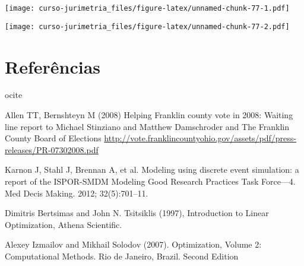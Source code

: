 \documentclass[]{book}
\newenvironment{Shaded}{\begin{snugshade}}{\end{snugshade}}
\newcommand{\KeywordTok}[1]{\textcolor[rgb]{0.13,0.29,0.53}{\textbf{{#1}}}}
\newcommand{\DataTypeTok}[1]{\textcolor[rgb]{0.13,0.29,0.53}{{#1}}}
\newcommand{\DecValTok}[1]{\textcolor[rgb]{0.00,0.00,0.81}{{#1}}}
\newcommand{\StringTok}[1]{\textcolor[rgb]{0.31,0.60,0.02}{{#1}}}
\newcommand{\NormalTok}[1]{{#1}}
\begin{document}
\texttt{[image: curso-jurimetria\_files/figure-latex/unnamed-chunk-77-1.pdf]}

\begin{Shaded}
\end{Shaded}

\texttt{[image: curso-jurimetria\_files/figure-latex/unnamed-chunk-77-2.pdf]}

\chapter{Referências}\label{referencias}

ocite

Allen TT, Bernshteyn M (2008) Helping Franklin county vote in 2008:
Waiting line report to Michael Stinziano and Matthew Damschroder and The
Franklin County Board of Elections
\url{http://vote.franklincountyohio.gov/assets/pdf/press-releases/PR-07302008.pdf}

Karnon J, Stahl J, Brennan A, et al. Modeling using discrete event
simulation: a report of the ISPOR-SMDM Modeling Good Research Practices
Task Force---4. Med Decis Making. 2012; 32(5):701--11.

Dimitris Bertsimas and John N. Tsitsiklis (1997), Introduction to Linear
Optimization, Athena Scientific.

Alexey Izmailov and Mikhail Solodov (2007). Optimization, Volume 2:
Computational Methods. Rio de Janeiro, Brazil. Second Edition


\end{document}

